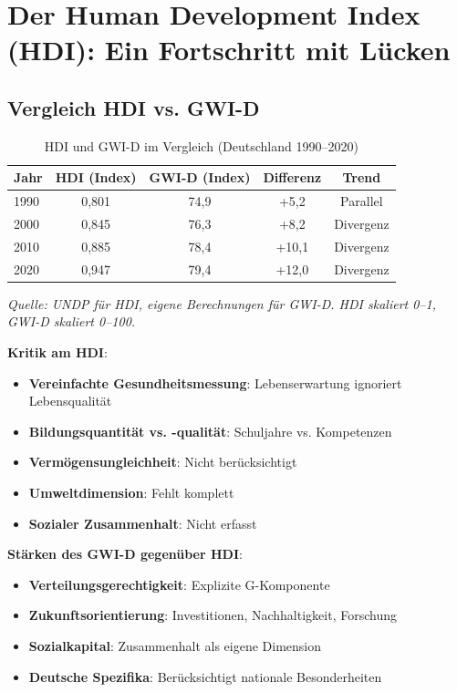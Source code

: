 \section{Der Human Development Index (HDI): Ein Fortschritt mit Lücken}

\subsection{Vergleich HDI vs. GWI-D}

\begin{table}[ht]
    \centering
    \caption{HDI und GWI-D im Vergleich (Deutschland 1990–2020)}
    \label{tab:hdi_vs_gwi}
    \begin{tabular}{lcccc}
        \toprule
        \textbf{Jahr} & \textbf{HDI (Index)} & \textbf{GWI-D (Index)} & \textbf{Differenz} & \textbf{Trend} \\
        \midrule
        1990 & 0,801 & 74,9 & +5,2 & Parallel \\
        2000 & 0,845 & 76,3 & +8,2 & Divergenz \\
        2010 & 0,885 & 78,4 & +10,1 & Divergenz \\
        2020 & 0,947 & 79,4 & +12,0 & Divergenz \\
        \bottomrule
    \end{tabular}
\end{table}

\begin{flushleft}
\footnotesize{\textit{Quelle: UNDP für HDI, eigene Berechnungen für GWI-D. HDI skaliert 0–1, GWI-D skaliert 0–100.}}
\end{flushleft}

\textbf{Kritik am HDI}:

\begin{itemize}
    \item \textbf{Vereinfachte Gesundheitsmessung}: Lebenserwartung ignoriert Lebensqualität
    \item \textbf{Bildungsquantität vs. -qualität}: Schuljahre vs. Kompetenzen
    \item \textbf{Vermögensungleichheit}: Nicht berücksichtigt
    \item \textbf{Umweltdimension}: Fehlt komplett
    \item \textbf{Sozialer Zusammenhalt}: Nicht erfasst
\end{itemize}

\textbf{Stärken des GWI-D gegenüber HDI}:

\begin{itemize}
    \item \textbf{Verteilungsgerechtigkeit}: Explizite G-Komponente
    \item \textbf{Zukunftsorientierung}: Investitionen, Nachhaltigkeit, Forschung
    \item \textbf{Sozialkapital}: Zusammenhalt als eigene Dimension
    \item \textbf{Deutsche Spezifika}: Berücksichtigt nationale Besonderheiten
\end{itemize}

